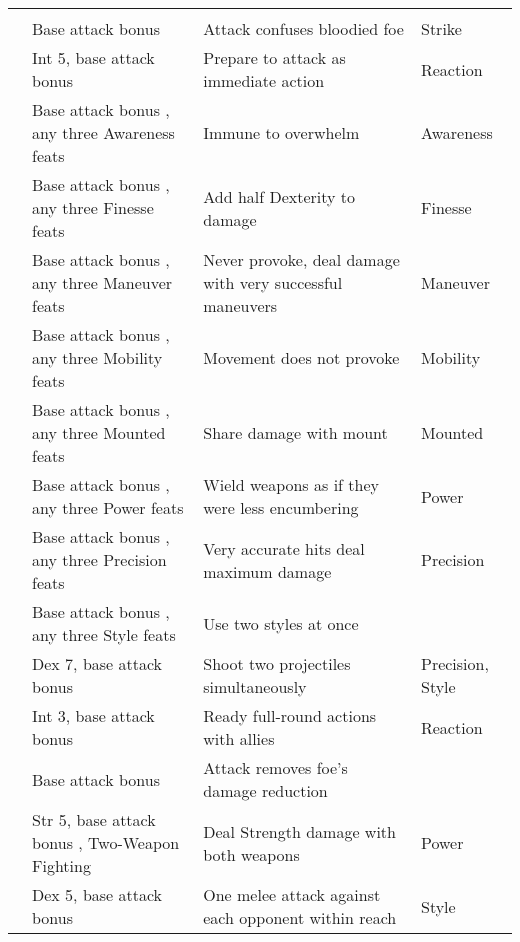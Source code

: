 {\begin{longtabu}{>{\lcol}p{15em} >{\lcol}p{15em} >{\lcol}X >{\lcol}p{10em}}
\midrule
{} &  &  &  \\
 & Base attack bonus  & Attack confuses bloodied foe & Strike \\
 & Int 5, base attack bonus  & Prepare to attack as immediate action & Reaction \\
 & Base attack bonus , any three Awareness feats & Immune to overwhelm & Awareness \\
 & Base attack bonus , any three Finesse feats & Add half Dexterity to damage & Finesse \\
 & Base attack bonus , any three Maneuver feats & Never provoke, deal damage with very successful maneuvers & Maneuver \\ 
 & Base attack bonus , any three Mobility feats & Movement does not provoke & Mobility\\
 & Base attack bonus , any three Mounted feats & Share damage with mount & Mounted\\
 & Base attack bonus , any three Power feats & Wield weapons as if they were less encumbering & Power\\ 
 & Base attack bonus , any three Precision feats & Very accurate hits deal maximum damage & Precision\\ 
 & Base attack bonus , any three Style feats & Use two styles at once & \x \\
 & Dex 7, base attack bonus  & Shoot two projectiles simultaneously & Precision, Style \\
 & Int 3, base attack bonus  & Ready full-round actions with allies & Reaction \\
 & Base attack bonus  & Attack removes foe's damage reduction \\
 & Str 5, base attack bonus , Two-Weapon Fighting & Deal Strength damage with both weapons & Power \\
 & Dex 5, base attack bonus  & One melee attack against each opponent within reach & Style \\


\end{longtabu}}
